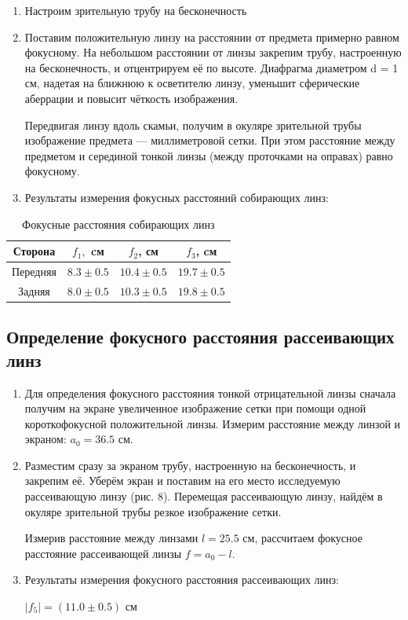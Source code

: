 \documentclass[a4paper,12pt]{article}
\begin{document}
\begin{enumerate}
    \item Настроим зрительную трубу на бесконечность
    \item Поставим положительную линзу на
расстоянии от предмета примерно равном фокусному. На небольшом расстоянии от линзы закрепим трубу, настроенную на бесконечность,
и отцентрируем её по высоте. Диафрагма диаметром
d = 1 см, надетая на ближнюю к осветителю линзу, уменьшит сферические аберрации и повысит чёткость изображения. \par
Передвигая линзу вдоль скамьи, получим в окуляре зрительной трубы изображение предмета
— миллиметровой сетки. При этом расстояние между предметом и серединой тонкой линзы (между проточками на оправах) равно фокусному.
    \item Результаты измерения фокусных расстояний собирающих линз:
\end{enumerate}
\begin{table}[h!]
	\caption{Фокусные расстояния собирающих линз}
	\begin{center}
		\begin{tabular}{|c|c|c|c|}
			\hline
			Сторона   & $ f_1,$ cм & $ f_2 $, см & $f_3 $, cм \\
			\hline
			Передняя &	 $8.3\pm0.5$	&	$10.4\pm0.5$   & $19.7\pm0.5$ \\
			\hline
			Задняя  &	$8.0\pm0.5$	&	$10.3\pm0.5$  & $19.8\pm0.5$ \\
			\hline
		\end{tabular}
	\end{center}
\end{table}

\subsection*{Определение фокусного расстояния рассеивающих линз}
\begin{enumerate}
    \item Для определения фокусного расстояния тонкой отрицательной линзы сначала получим на экране увеличенное изображение сетки при помощи одной короткофокусной положительной линзы. Измерим расстояние между линзой и экраном: $a_0 = 36.5$ см.
    \item Разместим сразу за экраном трубу, настроенную на бесконечность, и закрепим её. Уберём экран и поставим на его место исследуемую рассеивающую линзу (рис. 8). Перемещая рассеивающую линзу, найдём в окуляре зрительной трубы резкое изображение сетки. \par
    Измерив расстояние между линзами $l = 25.5$ см, рассчитаем фокусное расстояние рассеивающей линзы $f = a_0 - l$.
    \item Результаты измерения фокусного расстояния рассеивающих линз:
    \begin{center}
        $|f_5| = (11.0\pm0.5) $ см
    \end{center}
\end{enumerate}
\end{document}
